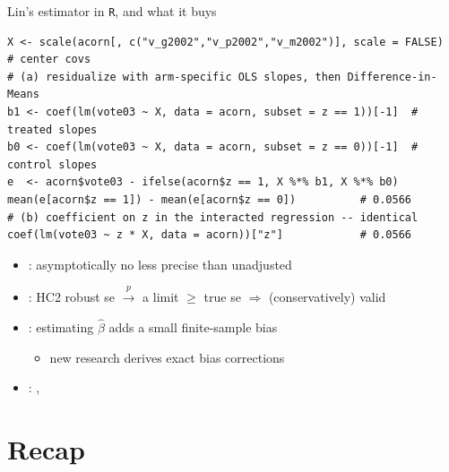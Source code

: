 \documentclass[table, xcolor = {dvipsnames}, 9pt]{beamer}
\theoremstyle{plain}
\newcommand{\mh}[1]{{\color{magenta}{#1}}}
\begin{document}
\begin{frame}[fragile]{Lin's estimator in \texttt{R}, and what it buys}
\begin{lstlisting}[style=Rstyle, basicstyle=\ttfamily\tiny, frame=single]
X <- scale(acorn[, c("v_g2002","v_p2002","v_m2002")], scale = FALSE)  # center covs
# (a) residualize with arm-specific OLS slopes, then Difference-in-Means
b1 <- coef(lm(vote03 ~ X, data = acorn, subset = z == 1))[-1]  # treated slopes
b0 <- coef(lm(vote03 ~ X, data = acorn, subset = z == 0))[-1]  # control slopes
e  <- acorn$vote03 - ifelse(acorn$z == 1, X %*% b1, X %*% b0)
mean(e[acorn$z == 1]) - mean(e[acorn$z == 0])          # 0.0566
# (b) coefficient on z in the interacted regression -- identical
coef(lm(vote03 ~ z * X, data = acorn))["z"]            # 0.0566
\end{lstlisting}
\begin{itemize} \vfill
\item \mh{Precision}: asymptotically no less precise than unadjusted \citep{lin2013} \vfill
\item \mh{Inference}: HC2 robust se $\overset{p}{\to}$ a limit $\geq$ true se $\Rightarrow$ (conservatively) valid \vfill
\item \mh{Small-sample bias}: estimating $\hat{\beta}$ adds a small finite-sample bias \citep{lin2013} \vfill
\begin{itemize} \vfill
\item[$-$] new research derives exact bias corrections \citep{changetal2024} \vfill
\end{itemize} \vfill
\item \mh{Nonlinear / generalized models}: \citet{guobasse2022}, \citet{cohenfogarty2022b} \vfill
\end{itemize}
\end{frame}
\section{Recap}
\end{document}
